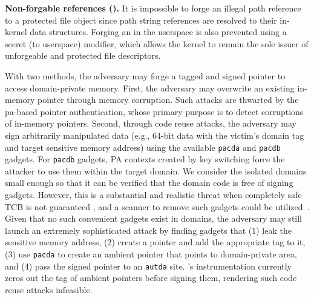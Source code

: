 \textbf{Non-forgable references (\srforge).}
It is impossible to forge an illegal path reference to a protected file object since path string references are resolved to their in-kernel data structures.
Forging an \fd in the userspace is also prevented using a secret (to userspace) modifier, which allows the kernel to remain the sole issuer of unforgeable and protected file descriptors.


With two methods, the adversary may forge a tagged and signed pointer to access domain-private memory.
First, the adversary may overwrite an existing in-memory pointer through memory corruption.
Such attacks are thwarted by the \gls{pa}-based pointer authentication, whose primary purpose is to detect corruptions of in-memory pointers.
Second, through code reuse attacks, the adversary may sign arbitrarily manipulated data (e.g., 64-bit data with the victim’s domain tag and target sensitive memory address) using the available \texttt{pacda} and \texttt{pacdb} gadgets.
For \texttt{pacdb} gadgets, \thename PA contexts created by key switching force the attacker to use them within the target domain. 
We consider the isolated domains small enough so that it can be verified that the domain code is free of signing gadgets.
However, this is a substantial and realistic threat when completely safe TCB is not guaranteed \cite{civ, kernel-pac}, and a scanner to remove such gadgets could be utilized~\cite{kernel-pac}.
Given that no such convenient gadgets exist in \thename domains, the adversary may still launch an extremely sophisticated attack by finding gadgets that (1) leak the sensitive memory address, (2) create a pointer and add the appropriate tag to it, (3) use \texttt{pacda} to create an ambient pointer that points to domain-private area, and (4) pass the signed pointer to an \texttt{autda} site.
\thename's instrumentation currently zeros out the tag of ambient pointers before signing them, rendering such code reuse attacks infeasible.



